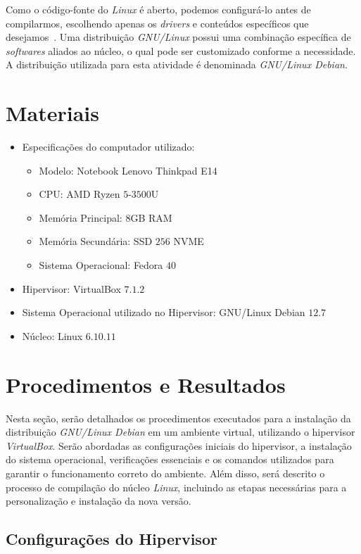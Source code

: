 \documentclass[
	12pt,				%
	oneside,   	        %
	a4paper,			%
	english,			%
	french,				%
	spanish,			%
	brazil,				%
	]{pacotes/abntex2}
\begin{document}
Como o código-fonte do \textit{Linux} é aberto, podemos configurá-lo antes de compilarmos, escolhendo apenas os \textit{drivers} e conteúdos específicos que desejamos~\cite{robert2010}. Uma distribuição \textit{GNU/Linux} possui uma combinação específica de \textit{softwares} aliados ao núcleo, o qual pode ser customizado conforme a necessidade. A distribuição utilizada para esta atividade é denominada \textit{GNU/Linux Debian}.

\section{Materiais}
\label{sec:materiais}

\begin{itemize}
  \item Especificações do computador utilizado:
  \begin{itemize}
    \item Modelo: Notebook Lenovo Thinkpad E14
    \item CPU: AMD Ryzen $5$-$3500$U
    \item Memória Principal: $8$GB RAM
    \item Memória Secundária: SSD $256$ NVME
    \item Sistema Operacional: Fedora $40$
  \end{itemize}
  \item Hipervisor: VirtualBox $7.1.2$
  \item Sistema Operacional utilizado no Hipervisor: GNU/Linux Debian $12.7$
  \item Núcleo: Linux $6.10.11$
\end{itemize}

\section{Procedimentos e Resultados}
\label{sec:procedimentos}

Nesta seção, serão detalhados os procedimentos executados para a instalação da distribuição \textit{GNU/Linux Debian} em um ambiente virtual, utilizando o hipervisor \textit{VirtualBox}. Serão abordadas as configurações iniciais do hipervisor, a instalação do sistema operacional, verificações essenciais e os comandos utilizados para garantir o funcionamento correto do ambiente. Além disso, será descrito o processo de compilação do núcleo \textit{Linux}, incluindo as etapas necessárias para a personalização e instalação da nova versão. 

\subsection{Configurações do Hipervisor}
\label{subsec:hipervisor}
\end{document}

